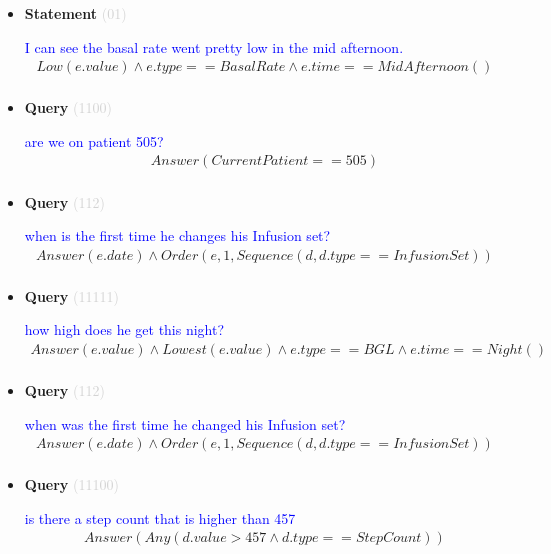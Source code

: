 \documentclass[11pt]{article}
\newcommand{\key}[1]{\textcolor{lightgray}{#1}}
\newcounter{CQuery}
\newcounter{CStatement}
\begin{document}
\begin{itemize}
\item
\textbf{Statement\theCStatement} \key{(01)} \addtocounter{CStatement}{1}
\textcolor{blue}{ I can see the basal rate went pretty low in the mid afternoon. }
\begin{multline*}
Low(e.value) \wedge e.type==BasalRate \wedge e.time==MidAfternoon() \\ 
\end{multline*}


\item
\textbf{Query\theCQuery} \key{(1100)} \addtocounter{CQuery}{1}
\textcolor{blue}{ are we on patient 505? }
\begin{multline*}
Answer(CurrentPatient==505) \\ 
\end{multline*}


\item
\textbf{Query\theCQuery} \key{(112)} \addtocounter{CQuery}{1}
\textcolor{blue}{ when is the first time he changes his Infusion set? }
\begin{multline*}
Answer(e.date) \wedge Order(e, 1, Sequence(d, d.type==InfusionSet)) \\ 
\end{multline*}


\item
\textbf{Query\theCQuery} \key{(11111)} \addtocounter{CQuery}{1}
\textcolor{blue}{ how high does he get this night? }
\begin{multline*}
Answer(e.value) \wedge Lowest(e.value) \wedge e.type==BGL \wedge e.time==Night() \\ 
\end{multline*}


\item
\textbf{Query\theCQuery} \key{(112)} \addtocounter{CQuery}{1}
\textcolor{blue}{ when was the first time he changed his Infusion set? }
\begin{multline*}
Answer(e.date) \wedge Order(e, 1, Sequence(d, d.type==InfusionSet)) \\ 
\end{multline*}


\item
\textbf{Query\theCQuery} \key{(11100)} \addtocounter{CQuery}{1}
\textcolor{blue}{ is there a step count that is higher than 457 }
\begin{multline*}
Answer(Any(d.value>457 \wedge d.type==StepCount)) \\ 
\end{multline*}



\end{itemize}
\end{document}
